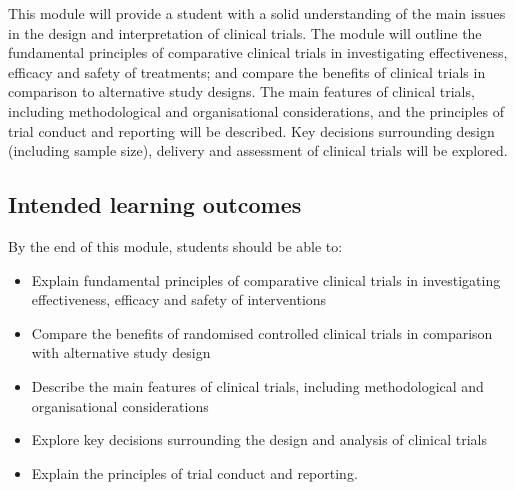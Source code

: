 This module will provide a student with a solid understanding of the main
issues in the design and interpretation of clinical trials. The module will outline
the fundamental principles of comparative clinical trials in investigating
effectiveness, efficacy and safety of treatments; and compare the benefits of
clinical trials in comparison to alternative study designs. The main features of
clinical trials, including methodological and organisational considerations, and
the principles of trial conduct and reporting will be described. Key decisions
surrounding design (including sample size), delivery and assessment of clinical
trials will be explored.

\subsection{Intended learning outcomes}

By the end of this module, students should be able to:
\begin{itemize}
\item Explain fundamental principles of comparative clinical trials in
investigating effectiveness, efficacy and safety of interventions
\item Compare the benefits of randomised controlled clinical trials in comparison
with alternative study design
\item Describe the main features of clinical trials, including methodological and
organisational considerations
\item Explore key decisions surrounding the design and analysis of clinical trials
\item Explain the principles of trial conduct and reporting.
\end{itemize}
